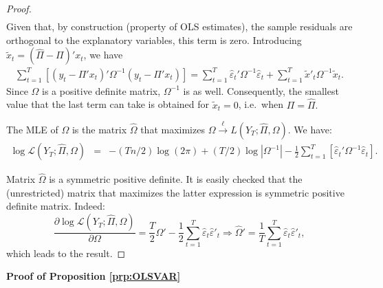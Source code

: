 \documentclass[
  12pt,
]{book}
\theoremstyle{definition}
\theoremstyle{definition}
\theoremstyle{definition}
\theoremstyle{definition}
\theoremstyle{remark}
\begin{document}
\begin{proof}
\begin{eqnarray*}
\end{eqnarray*}
Given that, by construction (property of OLS estimates), the sample residuals are orthogonal to the explanatory variables, this term is zero. Introducing \(\tilde{x}_{t}=(\hat{\Pi}-\Pi)'x_{t}\), we have
\begin{eqnarray*}
\sum_{t=1}^{T}\left[\left(y_{t}-\Pi'x_{t}\right)'\Omega^{-1}\left(y_{t}-\Pi'x_{t}\right)\right] =\sum_{t=1}^{T}\hat{\varepsilon}_{t}'\Omega^{-1}\hat{\varepsilon}_{t}+\sum_{t=1}^{T}\tilde{x}'_{t}\Omega^{-1}\tilde{x}_{t}.
\end{eqnarray*}
Since \(\Omega\) is a positive definite matrix, \(\Omega^{-1}\) is as well. Consequently, the smallest value that the last term can take is obtained for \(\tilde{x}_{t}=0\), i.e.~when \(\Pi=\hat{\Pi}.\)

The MLE of \(\Omega\) is the matrix \(\hat{\Omega}\) that maximizes \(\Omega\overset{\ell}{\rightarrow}L(Y_{T};\hat{\Pi},\Omega)\). We have:
\begin{eqnarray*}
\log\mathcal{L}(Y_{T};\hat{\Pi},\Omega) & = & -(Tn/2)\log(2\pi)+(T/2)\log\left|\Omega^{-1}\right| -\frac{1}{2}\sum_{t=1}^{T}\left[\hat{\varepsilon}_{t}'\Omega^{-1}\hat{\varepsilon}_{t}\right].
\end{eqnarray*}

Matrix \(\hat{\Omega}\) is a symmetric positive definite. It is easily checked that the (unrestricted) matrix that maximizes the latter expression is symmetric positive definite matrix. Indeed:
\[
\frac{\partial \log\mathcal{L}(Y_{T};\hat{\Pi},\Omega)}{\partial\Omega}=\frac{T}{2}\Omega'-\frac{1}{2}\sum_{t=1}^{T}\hat{\varepsilon}_{t}\hat{\varepsilon}'_{t}\Rightarrow\hat{\Omega}'=\frac{1}{T}\sum_{t=1}^{T}\hat{\varepsilon}_{t}\hat{\varepsilon}'_{t},
\]
which leads to the result.
\end{proof}

\textbf{Proof of Proposition \ref{prp:OLSVAR}}
\end{document}
